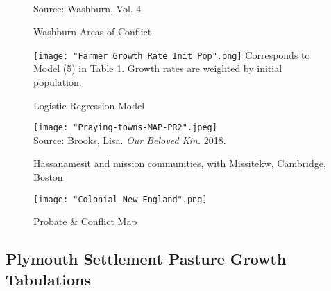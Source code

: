 \documentclass[sn-mathphys]{sn-jnl}%
\theoremstyle{thmstyleone}%
\theoremstyle{thmstyletwo}%
\theoremstyle{thmstylethree}%
\begin{document}
\begin{appendices}
\begin{figure}[h]
\caption{Washburn Areas of Conflict}
  \\
Source: Washburn, Vol. 4
\end{figure}

\begin{figure}[h]
\caption{Logistic Regression Model}
  \texttt{[image: "Farmer Growth Rate Init Pop".png]} 
Corresponds to Model (5) in Table 1. Growth rates are weighted by initial population.
\end{figure}

\begin{figure}[h]
\caption{Hassanamesit and mission communities, with Missitekw, Cambridge, Boston}
  \texttt{[image: "Praying-towns-MAP-PR2".jpeg]} \\
Source: Brooks, Lisa. {\em Our Beloved Kin.} 2018.
\end{figure}

\begin{figure}[h]
\caption{Probate \& Conflict Map}
  \texttt{[image: "Colonial New England".png]} \\

\end{figure}


\newpage

\begin{landscape}
\section{Plymouth Settlement Pasture Growth Tabulations}\label{secA3}



\end{landscape}
\end{appendices}
\end{document}
